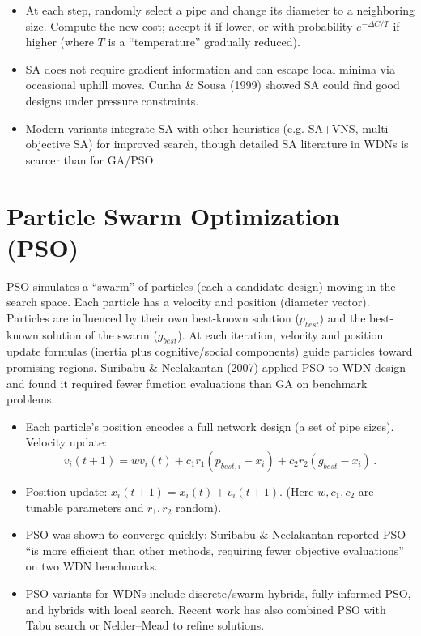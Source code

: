 \documentclass[12pt, a4paper]{article}
\begin{document}
\begin{itemize}
	\item At each step, randomly select a pipe and change its diameter to a neighboring size. Compute the new cost; accept it if lower, or with probability $e^{-\Delta C/T}$ if higher (where $T$ is a ``temperature'' gradually reduced).
	\item SA does not require gradient information and can escape local minima via occasional uphill moves. Cunha \& Sousa (1999) showed SA could find good designs under pressure constraints\cite{ref4}.
	\item Modern variants integrate SA with other heuristics (e.g. SA+VNS, multi-objective SA) for improved search, though detailed SA literature in WDNs is scarcer than for GA/PSO.
\end{itemize}

\section*{Particle Swarm Optimization (PSO)}
PSO simulates a ``swarm'' of particles (each a candidate design) moving in the search space. Each particle has a velocity and position (diameter vector). Particles are influenced by their own best-known solution ($p_{best}$) and the best-known solution of the swarm ($g_{best}$). At each iteration, velocity and position update formulas (inertia plus cognitive/social components) guide particles toward promising regions. Suribabu \& Neelakantan (2007) applied PSO to WDN design\cite{ref5} and found it required fewer function evaluations than GA on benchmark problems.

\begin{itemize}
	\item Each particle's position encodes a full network design (a set of pipe sizes). Velocity update:
	      $$v_{i}(t+1) = w v_i(t) + c_1 r_1 (p_{best,i} - x_i) + c_2 r_2 (g_{best} - x_i)\,.$$
	\item Position update: $x_i(t+1)=x_i(t)+v_i(t+1)$. (Here $w,c_1,c_2$ are tunable parameters and $r_1,r_2$ random).
	\item PSO was shown to converge quickly: Suribabu \& Neelakantan reported PSO ``is more efficient than other methods, requiring fewer objective evaluations'' on two WDN benchmarks\cite{ref5}.
	\item PSO variants for WDNs include discrete/swarm hybrids, fully informed PSO, and hybrids with local search. Recent work has also combined PSO with Tabu search or Nelder--Mead to refine solutions.
\end{itemize}
\end{document}
